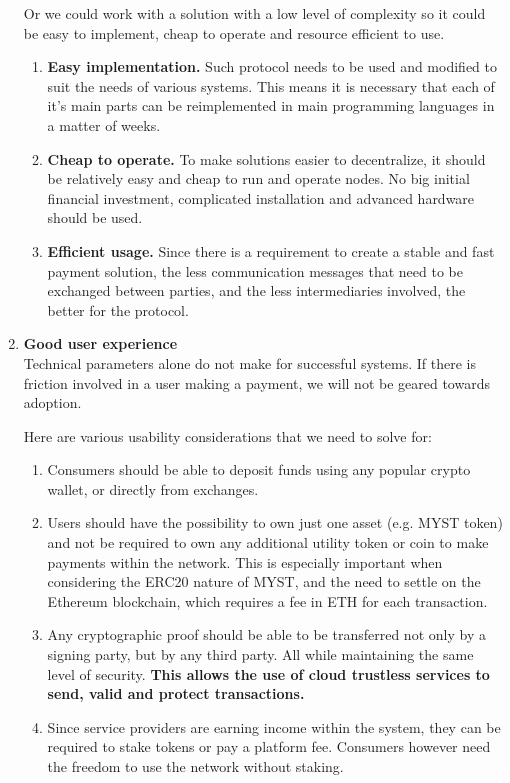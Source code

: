 \documentclass[a4paper,12pt]{article}
\begin{document}
\begin{enumerate}
    Or we could work with a solution with a low level of complexity so it could be 
    easy to implement, cheap to operate and resource efficient to use. 

    \begin{enumerate}
        \item \textbf{Easy implementation.} Such protocol needs to be used and 
        modified to suit the needs of various systems. This means it is necessary 
        that each of it’s main parts can be reimplemented in main programming 
        languages in a matter of weeks.
        \item \textbf{Cheap to operate.} To make solutions easier to decentralize, 
        it should be relatively easy and cheap to run and operate nodes. No big 
        initial financial investment, complicated installation and advanced 
        hardware should be used.
        \item \textbf{Efficient usage.} Since there is a requirement to create a 
        stable and fast payment solution, the less communication messages that 
        need to be exchanged between parties, and the less intermediaries involved, 
        the better for the protocol.
    \end{enumerate}

    \item \textbf{Good user experience}\\
    Technical parameters alone do not make for successful systems. If there is 
    friction involved in a user making a payment, we will not be geared towards 
    adoption.

    Here are various usability considerations that we need to solve for:
    \begin{enumerate}
        \item Consumers should be able to deposit funds using any popular crypto 
        wallet, or directly from exchanges.
        \item Users should have the possibility to own just one asset (e.g. MYST 
        token) and not be required to own any additional utility token or coin to 
        make payments within the network. This is especially important when 
        considering the ERC20 nature of MYST, and the need to settle on the 
        Ethereum blockchain, which requires a fee in ETH for each transaction. 
        \item Any cryptographic proof should be able to be transferred not only 
        by a signing party, but by any third party. All while maintaining the same
        level of security. \textbf{This allows the use of cloud trustless services 
        to send, valid and protect transactions.}
        \item Since service providers are earning income within the system, they 
        can be required to stake tokens or pay a platform fee. Consumers however 
        need the freedom to use the network without staking.
    \end{enumerate}
\end{enumerate}
\end{document}
